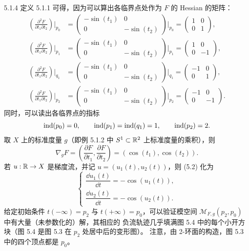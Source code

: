 \begin{wexam}{5.1.4}
定义 5.1.1 可得，因为可以算出各临界点处作为 $F$ 的 Hessian 的矩阵：
\begin{align*}
\left(\frac{\partial^2 F}{\partial t_1\partial t_2}\right)\bigg|_{p_0}
&=\begin{pmatrix}-\sin(t_1)&0\\0&-\sin(t_2)\end{pmatrix}\bigg|_{p_0}
=\begin{pmatrix}1&0\\0&1\end{pmatrix},\\
\left(\frac{\partial^2 F}{\partial t_1\partial t_2}\right)\bigg|_{p_1}
&=\begin{pmatrix}-\sin(t_1)&0\\0&-\sin(t_2)\end{pmatrix}\bigg|_{p_1}
=\begin{pmatrix}1&0\\0&-1\end{pmatrix},\\
\left(\frac{\partial^2 F}{\partial t_1\partial t_2}\right)\bigg|_{q_1}
&=\begin{pmatrix}-\sin(t_1)&0\\0&-\sin(t_2)\end{pmatrix}\bigg|_{q_1}
=\begin{pmatrix}-1&0\\0&1\end{pmatrix},\\
\left(\frac{\partial^2 F}{\partial t_1\partial t_2}\right)\bigg|_{p_2}
&=\begin{pmatrix}-\sin(t_1)&0\\0&-\sin(t_2)\end{pmatrix}\bigg|_{p_2}
=\begin{pmatrix}-1&0\\0&-1\end{pmatrix}.
\end{align*}
同时，可以读出各临界点的指标
\[
\operatorname{ind}(p_0)=0,\qquad \operatorname{ind}(p_1)=\operatorname{ind}(q_1)=1,\qquad \operatorname{ind}(p_2)=2.
\]
取 $X$ 上的标准度量 $g$（即例 5.1.2 中 $S^1\subset\mathbb{R}^2$ 上标准度量的乘积），则
\[
\nabla_g F=\left(\frac{\partial F}{\partial t_1},\frac{\partial F}{\partial t_2}\right)
=(\cos(t_1),\cos(t_2)).
\]
若 $u:\mathbb{R}\to X$ 是梯度流，并记 $u=(u_1(t),u_2(t))$，则 (5.2) 化为
\[
\begin{cases}
\dfrac{\dd u_1(t)}{\dd t}=-\cos(u_1(t)),\\[8pt]
\dfrac{\dd u_2(t)}{\dd t}=-\cos(u_2(t)).
\end{cases}
\]
给定初始条件 $t(-\infty)=p_2$ 与 $t(+\infty)=p_0$，可以验证模空间
$\mathcal M_{F,g}(p_2,p_0)$ 中有大量（未参数化的）解，其相应的
负流轨迹几乎填满图 5.4 中的每个小开方块（图 5.4 是图 5.3 在 $p_2$ 处居中后的变形图）。
注意，由 2-环面的构造，图 5.3 中的四个顶点都是 $p_0$。


\end{wexam}

